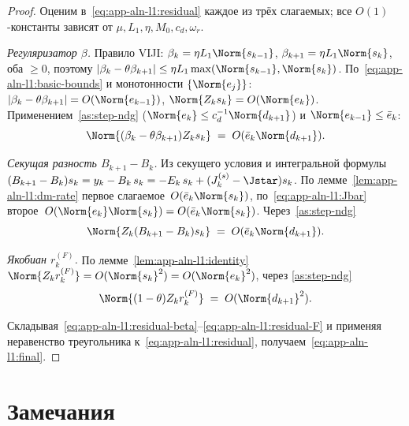 \begin{proof}
Оценим в~\eqref{eq:app-aln-l1:residual} каждое из трёх слагаемых;
все $O(1)$-константы зависят от $\mu,L_1,\eta,M_0,c_d,\omega_r$.

\emph{Регуляризатор $\beta$.} Правило VIJI: $\beta_k = \eta L_1\Norm{s_{k-1}}$,
$\beta_{k+1} = \eta L_1\Norm{s_k}$, оба $\ge 0$, поэтому
$|\beta_k - \theta\beta_{k+1}| \le \eta L_1\max(\Norm{s_{k-1}},\Norm{s_k})$.
По~\eqref{eq:app-aln-l1:basic-bounds} и монотонности $\{\Norm{e_j}\}$:
$|\beta_k-\theta\beta_{k+1}| = O(\Norm{e_{k-1}})$, $\Norm{Z_k s_k} =
O(\Norm{e_k})$. Применением~\ref{as:step-ndg} ($\Norm{e_k}\le c_d^{-1}\Norm{d_{k+1}}$)
и $\Norm{e_{k-1}}\le\bar e_k$:
\begin{equation}
\Norm{(\beta_k-\theta\beta_{k+1})Z_k s_k} \;=\; O(\bar e_k\Norm{d_{k+1}}).
\label{eq:app-aln-l1:residual-beta}
\end{equation}

\emph{Секущая разность $B_{k+1}-B_k$.} Из секущего условия и интегральной
формулы $(B_{k+1}-B_k)s_k = y_k - B_k\,s_k = -E_k\,s_k + (J_k^{(s)} - \Jstar)s_k$.
По лемме~\ref{lem:app-aln-l1:dm-rate} первое слагаемое~$O(\bar e_k\Norm{s_k})$,
по~\eqref{eq:app-aln-l1:Jbar} второе~$O(\Norm{e_k}\Norm{s_k}) =
O(\bar e_k\Norm{s_k})$. Через~\ref{as:step-ndg}
\begin{equation}
\Norm{Z_k(B_{k+1}-B_k)s_k} \;=\; O(\bar e_k\Norm{d_{k+1}}).
\label{eq:app-aln-l1:residual-B}
\end{equation}

\emph{Якобиан $r_k^{(F)}$.} По лемме~\ref{lem:app-aln-l1:identity}
$\Norm{Z_k r_k^{(F)}} = O(\Norm{s_k}^{2}) = O(\Norm{e_k}^{2})$, через
\ref{as:step-ndg}
\begin{equation}
\Norm{(1-\theta)Z_k r_k^{(F)}} \;=\; O(\Norm{d_{k+1}}^{2}).
\label{eq:app-aln-l1:residual-F}
\end{equation}

Складывая~\eqref{eq:app-aln-l1:residual-beta}--\eqref{eq:app-aln-l1:residual-F}
и применяя неравенство треугольника к~\eqref{eq:app-aln-l1:residual},
получаем~\eqref{eq:app-aln-l1:final}.
\end{proof}

\section{Замечания}
\label{sec:app-aln-l1:remarks}

